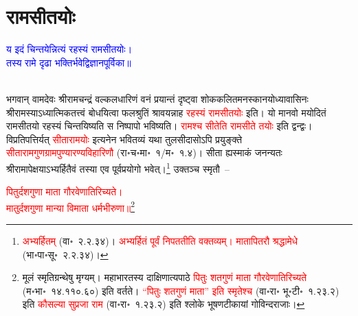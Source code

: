 \section[रामसीतयोः]{रामसीतयोः}
\centering\textcolor{blue}{य इदं चिन्तयेन्नित्यं रहस्यं रामसीतयोः।\nopagebreak\\
तस्य रामे दृढा भक्तिर्भवेद्विज्ञानपूर्विका॥}\nopagebreak\\
\\
\begin{sloppypar}\justifying\noindent\hspace{10mm} भगवान् वामदेवः श्रीरामचन्द्रं वल्कल\-धारिणं वनं प्रयान्तं दृष्ट्वा शोक\-कलित\-मनस्कानयोध्या\-वासिनः श्रीरामस्याऽध्यात्मिक\-तत्त्वं बोधयित्वा फल\-श्रुतिं श्रावयन्नाह \textcolor{red}{रहस्यं राम\-सीतयोः} इति। यो मानवो मयोदितं राम\-सीतयो रहस्यं चिन्तयिष्यति स निष्पापो भविष्यति। \textcolor{red}{रामश्च सीतेति रामसीते तयोः} इति द्वन्द्वः। विप्रतिपत्तिर्यत् \textcolor{red}{सीता\-रामयोः} इत्यनेन भवितव्यं यथा तुलसीदासोऽपि प्रयुङ्क्ते \textcolor{red}{सीता\-राम\-गुण\-ग्राम\-पुण्यारण्य\-विहारिणौ} (रा॰च॰मा॰~१/म॰~१.४)। सीता ह्यस्माकं जनन्यतः श्रीरामापेक्षयाऽभ्यर्हितैवं तस्या एव पूर्व\-प्रयोगो भवेत्।\footnote{\textcolor{red}{अभ्यर्हितम्} (वा॰~२.२.३४)। \textcolor{red}{अभ्यर्हितं पूर्वं निपततीति वक्तव्यम्। मातापितरौ श्रद्धामेधे} (भा॰पा॰सू॰~२.२.३४)।} उक्तञ्च स्मृतौ~–\end{sloppypar}
\centering\textcolor{red}{पितुर्दशगुणा माता गौरवेणातिरिच्यते।\nopagebreak\\
मातुर्दशगुणा मान्या विमाता धर्मभीरुणा॥}\footnote{मूलं स्मृति\-ग्रन्थेषु मृग्यम्। महाभारतस्य दाक्षिणात्य\-पाठे \textcolor{red}{पितुः शतगुणं माता गौरवेणातिरिच्यते} (म॰भा॰~१४.११०.६०) इति वर्तते। \textcolor{red}{“पितुः शतगुणं माता” इति स्मृतेश्च} (वा॰रा॰ भू॰टी॰~१.२३.२) इति \textcolor{red}{कौसल्या सुप्रजा राम} (वा॰रा॰~१.२३.२) इति श्लोके भूषण\-टीकायां गोविन्दराजाः।}\\

